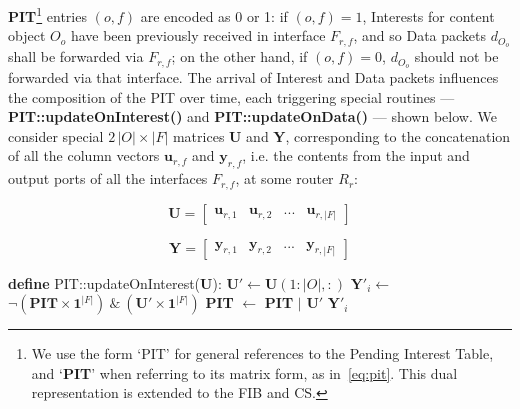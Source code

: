 \textbf{PIT}\footnote{We use the form `PIT' for general references to the Pending 
Interest Table, and `\textbf{PIT}' when referring to its matrix form, as in~\ref{eq:pit}. 
This dual representation is extended to the FIB and CS.} entries 
$(o,f)$ are encoded as 0 or 1: if $(o,f) = 1$, Interests for content object 
$O_o$ have been previously received in interface $F_{r,f}$, and so Data 
packets $d_{O_o}$ shall be forwarded via $F_{r,f}$; on the other hand, 
if $(o,f) = 0$, $d_{O_o}$ should not be forwarded via that 
interface. The arrival of Interest and Data packets influences the composition of 
the PIT over time, each triggering special routines --- \textbf{PIT::updateOnInterest()} and 
\textbf{PIT::updateOnData()} --- shown below. We consider 
special $2\,|O| \times |F|$ matrices \textbf{U} and \textbf{Y}, corresponding to the concatenation of 
all the column vectors $\textbf{u}_{r,f}$ and $\textbf{y}_{r,f}$, i.e. the contents from the input and output ports 
of all the interfaces $F_{r,f}$, at some router $R_r$:

\begin{equation}
\textbf{U} = \begin{bmatrix} \textbf{u}_{r,1} & \textbf{u}_{r,2} & ... & \textbf{u}_{r,|F|} \end{bmatrix}
    \label{eq:a}
\end{equation}

\begin{equation}
\textbf{Y} = \begin{bmatrix} \textbf{y}_{r,1} & \textbf{y}_{r,2} & ... & \textbf{y}_{r,|F|} \end{bmatrix}
    \label{eq:b}
\end{equation}\shortvertbreak

\begin{algorithmic}[1]

\State \textbf{define} PIT::updateOnInterest(\textbf{U}):
\State
    \State $\textbf{U}' \leftarrow \textbf{U}(1:|O|,:)$
    \State $\textbf{Y}'_i \leftarrow$ $\neg(\textbf{PIT} \times \textbf{1}^{|F|}) \ \& \ (\textbf{U}' \times \textbf{1}^{|F|})$
    \State \textbf{PIT} $\leftarrow$ \textbf{PIT} $|$ $\textbf{U}'$ 
    \State \Return $\textbf{Y}'_i$

\end{algorithmic}\shortvertbreak

